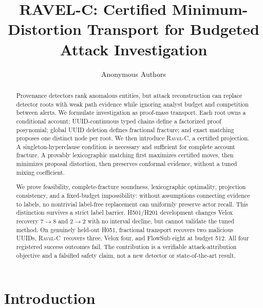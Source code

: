 \documentclass[runningheads]{llncs}
\newcommand{\ravelc}{\textsc{Ravel-C}}
\begin{document}
\title{RAVEL-C: Certified Minimum-Distortion Transport for Budgeted Attack Investigation}

\author{Anonymous Authors}

\maketitle

\begin{abstract}
Provenance detectors rank anomalous entities, but attack reconstruction can replace detector roots with weak path evidence while ignoring analyst budget and competition between alerts. We formulate investigation as proof-mass transport. Each root owns a conditional account; UUID-continuous typed chains define a factorized proof posynomial; global UUID deletion defines fractional fracture; and exact matching proposes one distinct node per root. We then introduce \ravelc, a certified projection. A singleton-hyperclause condition is necessary and sufficient for complete account fracture. A provably lexicographic matching first maximizes certified moves, then minimizes proposal distortion, then preserves conformal evidence, without a tuned mixing coefficient.

We prove feasibility, complete-fracture soundness, lexicographic optimality, projection consistency, and a fixed-budget impossibility: without assumptions connecting evidence to labels, no nontrivial label-free replacement can uniformly preserve actor recall. This distinction survives a strict label barrier. H501/H201 development changes Velox recovery \(7\!\rightarrow\!8\) and \(2\!\rightarrow\!2\) with no interval decline, but cannot validate the tuned method. On genuinely held-out H051, fractional transport recovers two malicious UUIDs, \ravelc\ recovers three, Velox four, and FlowSub eight at budget 512. All four registered success outcomes fail. The contribution is a verifiable attack-attribution objective and a falsified safety claim, not a new detector or state-of-the-art result.

\end{abstract}

\section{Introduction}
\end{document}
